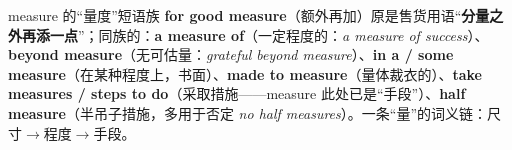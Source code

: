 \documentclass[../main.tex]{subfiles}
\begin{document}


\begin{gram}{measure 的“量度”短语族}
\textbf{for good measure}（额外再加）原是售货用语“\textbf{分量之外再添一点}”；同族的：\textbf{a measure of}（一定程度的：\textit{a measure of success}）、\textbf{beyond measure}（无可估量：\textit{grateful beyond measure}）、\textbf{in a / some measure}（在某种程度上，书面）、\textbf{made to measure}（量体裁衣的）、\textbf{take measures / steps to do}（采取措施——measure 此处已是“手段”）、\textbf{half measure}（半吊子措施，多用于否定 \textit{no half measures}）。一条“量”的词义链：尺寸$\to$程度$\to$手段。
\end{gram}
\end{document}

